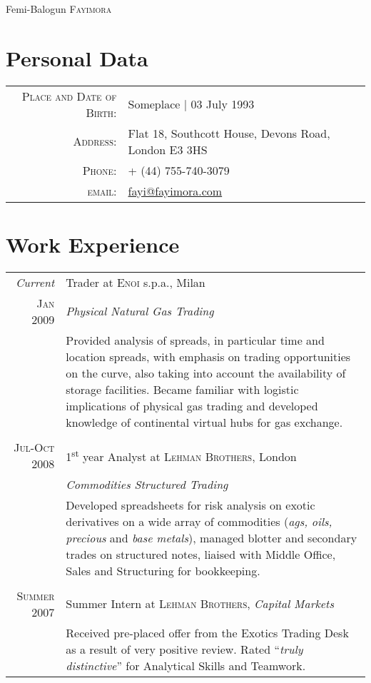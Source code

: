 \documentclass[a4paper,10pt]{article}
\begin{document}
\pagestyle{empty} %


\par{\centering
  {\Huge Femi-Balogun \textsc{Fayimora}
}\bigskip\par}

\section{Personal Data}

\begin{tabular}{rl}
  \textsc{Place and Date of Birth:} & Someplace  | 03 July 1993 \\
  \textsc{Address:}   & Flat 18, Southcott House, Devons Road, London E3 3HS \\
  \textsc{Phone:}     & + (44) 755-740-3079 \\
  \textsc{email:}     & \href{mailto:fayi@fayimora.com}{fayi@fayimora.com}
\end{tabular}

\section{Work Experience}
\begin{tabular}{r|p{11cm}}
  \emph{Current} & Trader at \textsc{Enoi} s.p.a., Milan \\\textsc{Jan 2009}&\emph{Physical Natural Gas Trading}\\&\footnotesize{Provided analysis of spreads, in particular time and location spreads, with emphasis on trading opportunities on the curve, also taking into account the availability of storage facilities. Became familiar with logistic implications of physical gas trading and developed knowledge of continental virtual hubs for gas exchange.}\\\multicolumn{2}{c}{} \\
  \textsc{Jul-Oct 2008} & 1\textsuperscript{st} year Analyst at \textsc{Lehman Brothers}, London \\&\emph{Commodities Structured Trading}\\&\footnotesize{Developed spreadsheets for risk analysis on exotic derivatives on a wide array of commodities (\textit{ags, oils, precious} and \textit{base metals}), managed blotter and secondary trades on structured notes, liaised with Middle Office, Sales and Structuring for bookkeeping.}\\\multicolumn{2}{c}{} \\
  \textsc{Summer 2007} & Summer Intern at \textsc{Lehman Brothers}, \emph{Capital Markets}\\&\footnotesize{Received pre-placed offer from the Exotics Trading Desk as a result of very positive review. Rated ``\emph{truly distinctive}'' for Analytical Skills and Teamwork.}
\end{tabular}
\end{document}
